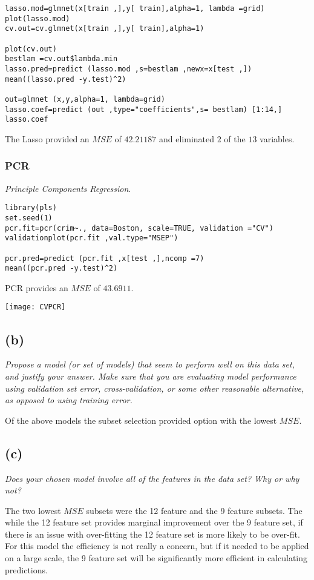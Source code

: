 \documentclass[a4paper,man,natbib]{apa6}
\begin{document}
\begin{verbatim}
lasso.mod=glmnet(x[train ,],y[ train],alpha=1, lambda =grid)
plot(lasso.mod)
cv.out=cv.glmnet(x[train ,],y[ train],alpha=1)

plot(cv.out)
bestlam =cv.out$lambda.min
lasso.pred=predict (lasso.mod ,s=bestlam ,newx=x[test ,])
mean((lasso.pred -y.test)^2)

out=glmnet (x,y,alpha=1, lambda=grid)
lasso.coef=predict (out ,type="coefficients",s= bestlam) [1:14,]
lasso.coef
\end{verbatim}

The Lasso provided an $MSE$ of $42.21187$ and eliminated $2$ of the $13$ variables.

\subsubsection{PCR} \emph{Principle Components Regression}.\\

\begin{verbatim}
library(pls)
set.seed(1)
pcr.fit=pcr(crim~., data=Boston, scale=TRUE, validation ="CV")
validationplot(pcr.fit ,val.type="MSEP")

pcr.pred=predict (pcr.fit ,x[test ,],ncomp =7)
mean((pcr.pred -y.test)^2)
\end{verbatim}

PCR provides an $MSE$ of $43.6911$.

\texttt{[image: CVPCR]}

\subsection{(b)} 
\emph{Propose a model (or set of models) that seem to perform well on
	this data set, and justify your answer. Make sure that you are
	evaluating model performance using validation set error, cross-validation, or some other reasonable alternative, as opposed to
	using training error.}

Of the above models the subset selection provided option with the lowest $MSE$. 

\subsection{(c)} 
\emph{Does your chosen model involve all of the features in the data
	set? Why or why not?}

The two lowest $MSE$ subsets were the 12 feature and the 9 feature subsets. 
The while the 12 feature set provides marginal improvement over the 9 feature set, if there is an issue with over-fitting the 12 feature set is more likely to be over-fit.
For this model the efficiency is not really a concern, but if it needed to be applied on a large scale, the 9 feature set will be significantly more efficient in calculating predictions.
\end{document}
